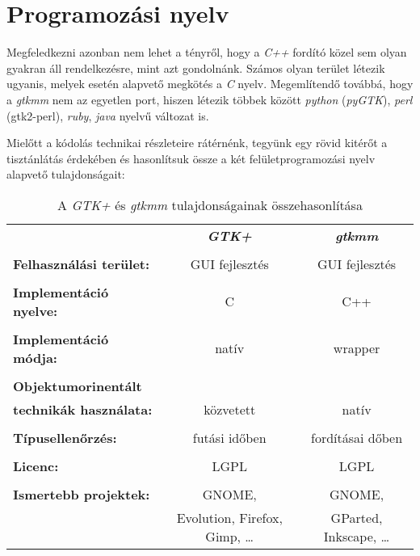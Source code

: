 \section{Programozási nyelv}

Megfeledkezni azonban nem lehet a tényről, hogy a \textit{C++} fordító közel sem olyan gyakran áll rendelkezésre, mint azt gondolnánk. Számos olyan terület létezik ugyanis, melyek esetén alapvető megkötés a \textit{C} nyelv. Megemlítendő továbbá, hogy a \textit{gtkmm} nem az egyetlen port, hiszen létezik többek között \textit{python} (\textit{pyGTK}), \textit{perl} (gtk2-perl), \textit{ruby}, \textit{java} nyelvű változat is.

Mielőtt a kódolás technikai részleteire rátérnénk, tegyünk egy rövid kitérőt a tisztánlátás érdekében és hasonlítsuk össze a két felületprogramozási nyelv alapvető tulajdonságait:\vspace{16pt}

\begin{table}[H]
\begin{center}
\begin{tabular}[t]{l c c}
                                       & \textbf{\textit{GTK+}}            & \textbf{\textit{gtkmm}}  \\\\
\textbf{Felhasználási terület:}        & GUI fejlesztés                    & GUI fejlesztés           \\\\
\textbf{Implementáció nyelve:}         & C                                 & C++                      \\\\
\textbf{Implementáció módja:}          & natív                             & wrapper                  \\\\
\textbf{Objektumorinentált}            &                                   &                          \\
\textbf{technikák használata:}         & közvetett                         & natív                    \\\\
\textbf{Típusellenőrzés:}              & futási időben                     & fordításai dőben         \\\\
\textbf{Licenc:}                       & LGPL                              & LGPL                     \\\\
\textbf{Ismertebb projektek:}          & GNOME,                            & GNOME,                   \\
                                       & Evolution, Firefox, Gimp, \dots   & GParted, Inkscape, \dots \\
\end{tabular}
\caption{A \textit{GTK+} és \textit{gtkmm} tulajdonságainak összehasonlítása}
\end{center}
\end{table}

